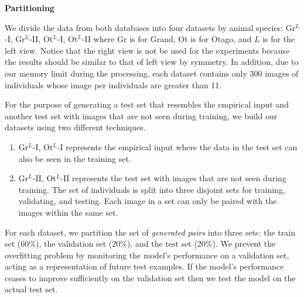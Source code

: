 \textbf{Partitioning}

We divide the data from both databases into four datasets by animal species:
Gr$^{L}$-I, Gr$^{L}$-II, Ot$^{L}$-I, Ot$^{L}$-II where Gr is for Grand, Ot is
for Otago, and $L$ is for the left view. Notice that the right view is not be used for the
experiments because the results should be similar to that of left view by
symmetry. In addition, due to our memory limit during the processing, each
dataset contains only 300 images of individuals whose image per individuals are
greater than 11.

For the purpose of generating a test set that resembles the empirical input and
another test set with images that are not seen during training, we build
our datasets using two different techniques.
\begin{enumerate}
  \item Gr$^{L}$-I, Ot$^{L}$-I represents the empirical input where the data in
  the test set can also be seen in the training set.
  \item Gr$^{L}$-II, Ot$^{L}$-II represents the test set with images that are
  not seen during training. The set of individuals is split into three
  disjoint sets for training, validating, and testing. Each image in a set can
  only be paired with the images within the same set.
\end{enumerate}

For each dataset, we partition the set of \emph{generated pairs} into three
sets: the train set (60\%), the validation set (20\%), and the test set (20\%).
We prevent the overfitting problem by monitoring the model's performance on a
validation set, acting as a representation of future test examples. If the
model's performance ceases to improve sufficiently on the validation set then
we test the model on the actual test set.


